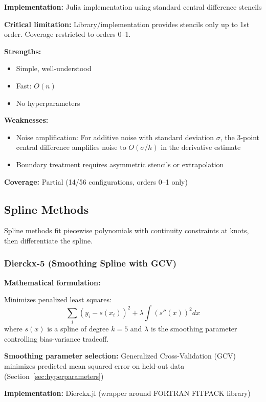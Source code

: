 \textbf{Implementation:} Julia implementation using standard central difference stencils

\textbf{Critical limitation:} Library/implementation provides stencils only up to 1st order. Coverage restricted to orders 0--1.

\textbf{Strengths:}
\begin{itemize}
    \item Simple, well-understood
    \item Fast: $O(n)$
    \item No hyperparameters
\end{itemize}

\textbf{Weaknesses:}
\begin{itemize}
    \item Noise amplification: For additive noise with standard deviation $\sigma$, the 3-point central difference amplifies noise to $O(\sigma/h)$ in the derivative estimate
    \item Boundary treatment requires asymmetric stencils or extrapolation
\end{itemize}

\textbf{Coverage:} Partial (14/56 configurations, orders 0--1 only)

\subsection{Spline Methods}
\label{sec:spline_methods}

Spline methods fit piecewise polynomials with continuity constraints at knots, then differentiate the spline.

\subsubsection{Dierckx-5 (Smoothing Spline with GCV)}

\textbf{Mathematical formulation:}

Minimizes penalized least squares:
\begin{equation}
\sum_i (y_i - s(x_i))^2 + \lambda \int (s''(x))^2 dx
\end{equation}
where $s(x)$ is a spline of degree $k=5$ and $\lambda$ is the smoothing parameter controlling bias-variance tradeoff.

\textbf{Smoothing parameter selection:} Generalized Cross-Validation (GCV) minimizes predicted mean squared error on held-out data (Section~\ref{sec:hyperparameters})

\textbf{Implementation:} Dierckx.jl (wrapper around FORTRAN FITPACK library)

